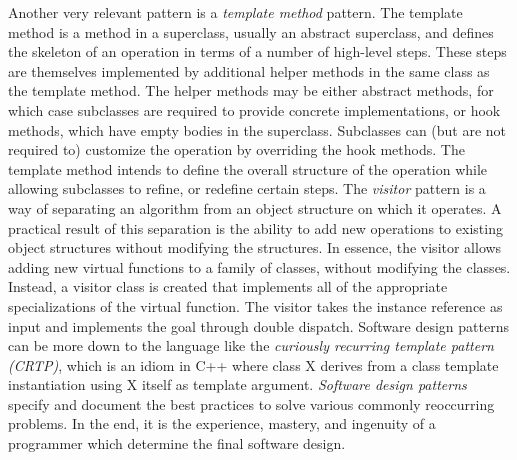 \quad Another very relevant pattern is a \textit{template method} pattern. The template method is a method in a superclass, usually an abstract superclass, and defines the skeleton of an operation in terms of a number of high-level steps. These steps are themselves implemented by additional helper methods in the same class as the template method. The helper methods may be either abstract methods, for which case subclasses are required to provide concrete implementations, or hook methods, which have empty bodies in the superclass. Subclasses can (but are not required to) customize the operation by overriding the hook methods. The template method intends to define the overall structure of the operation while allowing subclasses to refine, or redefine certain steps.\newline\null
\quad The \textit{visitor} pattern is a way of separating an algorithm from an object structure on which it operates. A practical result of this separation is the ability to add new operations to existing object structures without modifying the structures. In essence, the visitor allows adding new virtual functions to a family of classes, without modifying the classes. Instead, a visitor class is created that implements all of the appropriate specializations of the virtual function. The visitor takes the instance reference as input and implements the goal through double dispatch.\newline\null
\quad Software design patterns can be more down to the language like the \textit{curiously recurring template pattern (CRTP)}, which is an idiom in C++ where class X derives from a class template instantiation using X itself as template argument.\newline\null
\quad \textit{Software design patterns} specify and document the best practices to solve various commonly reoccurring problems. In the end, it is the experience, mastery, and ingenuity of a programmer which determine the final software design.  
